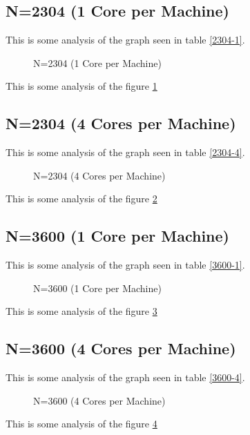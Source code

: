 \documentclass[a4paper]{article}
\begin{document}
\subsection{N=2304 (1 Core per Machine)}

This is some analysis of the graph seen in table \ref{2304-1}.

\begin{figure}
    
    \caption{N=2304 (1 Core per Machine)}
    \label{fig:2304_1}
\end{figure}

This is some analysis of the figure \ref{fig:2304_1}

\subsection{N=2304 (4 Cores per Machine)}

This is some analysis of the graph seen in table \ref{2304-4}.

\begin{figure}
    
    \caption{N=2304 (4 Cores per Machine)}
    \label{fig:2304_4}
\end{figure}

This is some analysis of the figure \ref{fig:2304_4}

\subsection{N=3600 (1 Core per Machine)}

This is some analysis of the graph seen in table \ref{3600-1}.

\begin{figure}
    
    \caption{N=3600 (1 Core per Machine)}
    \label{fig:3600_1}
\end{figure}

This is some analysis of the figure \ref{fig:3600_1}

\subsection{N=3600 (4 Cores per Machine)}

This is some analysis of the graph seen in table \ref{3600-4}.

\begin{figure}
    
    \caption{N=3600 (4 Cores per Machine)}
    \label{fig:3600_4}
\end{figure}

This is some analysis of the figure \ref{fig:3600_4}
\end{document}
